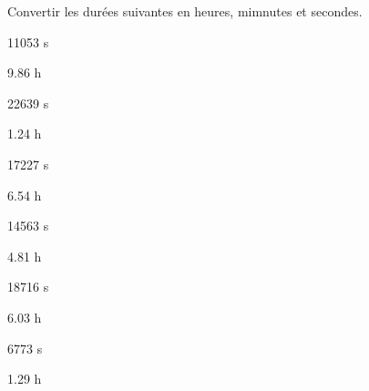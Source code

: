 Convertir les durées suivantes en heures, mimnutes et secondes.
\begin{multicols}{3}
11053 s\dotfill

\vspace*{1em}\dotfill

9.86 h\dotfill

\vspace*{1em}\dotfill

22639 s\dotfill

\vspace*{1em}\dotfill

1.24 h\dotfill

\vspace*{1em}\dotfill\columnbreak

17227 s\dotfill

\vspace*{1em}\dotfill

6.54 h\dotfill

\vspace*{1em}\dotfill

14563 s\dotfill

\vspace*{1em}\dotfill

4.81 h\dotfill

\vspace*{1em}\dotfill\columnbreak

18716 s\dotfill

\vspace*{1em}\dotfill

6.03 h\dotfill

\vspace*{1em}\dotfill

6773 s\dotfill

\vspace*{1em}\dotfill

1.29 h\dotfill

\vspace*{1em}\dotfill\columnbreak

\end{multicols}